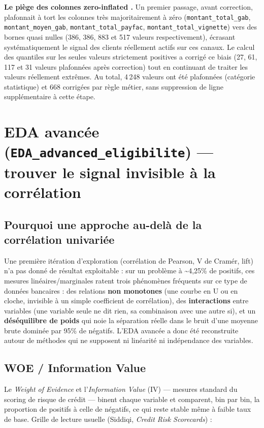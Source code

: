 \documentclass[11pt,a4paper]{report}
\begin{document}
\textbf{Le piège des colonnes \og zero-inflated \fg.} Un premier passage,
avant correction, plafonnait à tort les colonnes très majoritairement à
zéro (\texttt{montant\_total\_gab}, \texttt{montant\_moyen\_gab},
\texttt{montant\_total\_payfac}, \texttt{montant\_total\_vignette}) vers
des bornes quasi nulles (386, 386, 883 et 517 valeurs respectivement),
écrasant systématiquement le signal des clients réellement actifs sur ces
canaux. Le calcul des quantiles sur les seules valeurs strictement
positives a corrigé ce biais (27, 61, 117 et 31 valeurs plafonnées après
correction) tout en continuant de traiter les valeurs réellement extrêmes.
Au total, 4\,248 valeurs ont été plafonnées (catégorie statistique) et 668
corrigées par règle métier, sans suppression de ligne supplémentaire à
cette étape.

\section{EDA avancée (\texttt{EDA\_advanced\_eligibilite}) — trouver le signal invisible à la corrélation}
\statutFait{}

\subsection{Pourquoi une approche au-delà de la corrélation univariée}
Une première itération d'exploration (corrélation de Pearson, V de
Cramér, lift) n'a pas donné de résultat exploitable : sur un problème à
\textasciitilde 4,25\% de positifs, ces mesures linéaires/marginales
ratent trois phénomènes fréquents sur ce type de données bancaires : des
relations \textbf{non monotones} (une courbe en U ou en cloche, invisible
à un simple coefficient de corrélation), des \textbf{interactions} entre
variables (une variable seule ne dit rien, sa combinaison avec une autre
si), et un \textbf{déséquilibre de poids} qui noie la séparation réelle
dans le bruit d'une moyenne brute dominée par 95\% de négatifs. L'EDA
avancée a donc été reconstruite autour de méthodes qui ne supposent ni
linéarité ni indépendance des variables.

\subsection{WOE / Information Value}
Le \textit{Weight of Evidence} et l'\textit{Information Value} (IV) —
mesures standard du scoring de risque de crédit — binent chaque variable
et comparent, bin par bin, la proportion de positifs à celle de négatifs,
ce qui reste stable même à faible taux de base. Grille de lecture
usuelle (Siddiqi, \textit{Credit Risk Scorecards}) :
\end{document}
